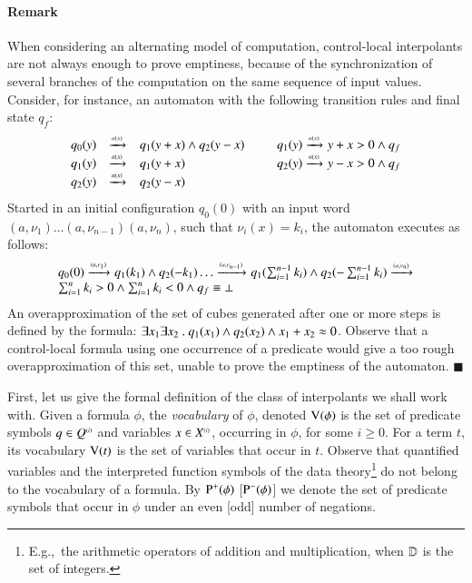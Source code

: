 \documentclass{llncs}
\begin{document}
\paragraph{Remark}
When considering an alternating model of computation, control-local
interpolants are not always enough to prove emptiness, because of the
synchronization of several branches of the computation on the same
sequence of input values. Consider, for instance, an automaton with
the following transition rules and final state $q_f$:
\[\begin{array}{rclcrcl}
q_0(y) & \xrightarrow{{\scriptscriptstyle a(x)}}_{{\scriptstyle }} & q_1(y+x) \wedge q_2(y-x) & \hspace*{2mm} & 
q_1(y) \xrightarrow{{\scriptscriptstyle a(x)}}_{{\scriptstyle }} y+x > 0 \wedge q_f \\
q_1(y) & \xrightarrow{{\scriptscriptstyle a(x)}}_{{\scriptstyle }} & q_1(y+x) && q_2(y) \xrightarrow{{\scriptscriptstyle a(x)}}_{{\scriptstyle }} y-x > 0 \wedge q_f \\
q_2(y) & \xrightarrow{{\scriptscriptstyle a(x)}}_{{\scriptstyle }} & q_2(y-x)
\end{array}\]
Started in an initial configuration $q_0(0)$ with an input word
$(a,\nu_1) \ldots (a,\nu_{n-1}) (a,\nu_n)$, such that $\nu_i(x)=k_i$,
the automaton executes as follows:
\[\begin{array}{l}
q_0(0) \xrightarrow{{\scriptscriptstyle (a,\nu_1)}}_{{\scriptstyle }} q_1(k_1)
\wedge q_2(-k_1) \ldots \xrightarrow{{\scriptscriptstyle (a,\nu_{n-1})}}_{{\scriptstyle }} 
q_1(\sum_{i=1}^{n-1} k_i) \wedge q_2(-\sum_{i=1}^{n-1} k_i) \xrightarrow{{\scriptscriptstyle (a,\nu_n)}}_{{\scriptstyle }} \\
\sum_{i=1}^{n} k_i > 0 \wedge \sum_{i=1}^{n} k_i < 0 \wedge q_f \equiv \bot
\end{array}\] 
An overapproximation of the set of cubes generated after one or more
steps is defined by the formula: $\exists x_1 \exists x_2 ~.~ q_1(x_1)
\wedge q_2(x_2) \wedge x_1+x_2 \approx 0$. Observe that a control-local
formula using one occurrence of a predicate would give a too rough
overapproximation of this set, unable to prove the emptiness of the
automaton. \hfill$\blacksquare$

First, let us give the formal definition of the class of interpolants
we shall work with. Given a formula $\phi$, the \emph{vocabulary} of
$\phi$, denoted $\mathrm{V}({\phi})$ is the set of predicate symbols $q \in
{Q}^{\scriptscriptstyle{({i})}}$ and variables $x \in {X}^{\scriptscriptstyle{({i})}}$, occurring in $\phi$,
for some $i\geq0$. For a term $t$, its vocabulary $\mathrm{V}({t})$ is the set
of variables that occur in $t$. Observe that quantified variables and
the interpreted function symbols of the data
theory\footnote{E.g.,\ the arithmetic operators of addition and
  multiplication, when $\mathbb{D}$ is the set of integers.}  do not belong
to the vocabulary of a formula. By $\mathrm{P}^{+}(\phi)$ [$\mathrm{P}^{-}(\phi)$]
we denote the set of predicate symbols that occur in $\phi$ under an
even [odd] number of negations.
\end{document}
